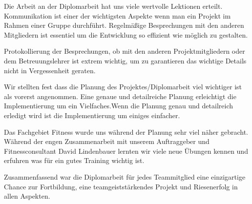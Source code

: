 \documentclass[FIPLY_base.tex]{subfiles}
\begin{document}
Die Arbeit an der Diplomarbeit hat uns viele wertvolle Lektionen erteilt.
Kommunikation ist einer der wichtigsten Aspekte wenn man ein Projekt im Rahmen einer Gruppe durchführt. 
Regelmäßige Besprechungen mit den anderen Mitgliedern ist essentiel um die Entwicklung so effizient wie möglich zu gestalten.

Protokollierung der Besprechungen, ob mit den anderen Projektmitgliedern oder dem Betreuungslehrer ist extrem wichtig, um zu garantieren das wichtige Details nicht in Vergessenheit geraten.

Wir stellten fest dass die Planung des Projektes/Diplomarbeit viel wichtiger ist als vorerst angenommen. 
Eine genaue und detailreiche Planung erleichtigt die Implementierung um ein Vielfaches.Wenn die Planung genau und detailreich erledigt wird ist die Implementierung um einiges einfacher.

Das Fachgebiet Fitness wurde uns während der Planung sehr viel näher gebracht. Während der engen Zusammenarbeit mit unserem Auftraggeber und Fitnessconsultant David Lindenbauer lernten wir viele neue Übungen kennen und erfuhren was für ein gutes Training wichtig ist.

Zusammenfassend war die Diplomarbeit für jedes Teammitglied eine einzigartige Chance zur Fortbildung, eine teamgeiststärkendes Projekt und Riesenerfolg in allen Aspekten.
\end{document}
